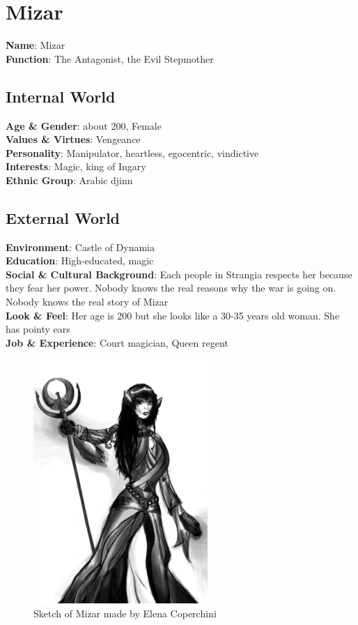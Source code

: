 \section{Mizar}

\begin{minipage}{0.5\textwidth}
\textbf{Name}: Mizar\\
\textbf{Function}: The Antagonist, the Evil Stepmother

\subsection{Internal World}

\textbf{Age \& Gender}: about 200, Female \\
\textbf{Values \& Virtues}: Vengeance \\
\textbf{Personality}: Manipulator, heartless, egocentric, vindictive \\
\textbf{Interests}: Magic, king of Ingary \\
\textbf{Ethnic Group}: Arabic djinn

\subsection{External World}
\textbf{Environment}: Castle of Dynamia \\
\textbf{Education}: High-educated, magic \\
\textbf{Social \& Cultural Background}: Each people in Strangia respects her because they fear her power. Nobody knows the real reasons why the war is going on. Nobody knows the real story of Mizar \\
\textbf{Look \& Feel}: Her age is 200 but she looks like a 30-35 years old woman. She has pointy ears  \\
\textbf{Job \& Experience}: Court magician, Queen regent \\

\end{minipage}%
%
\hfill\begin{minipage}{0.4\textwidth}
  \begin{figure}[H]
  \includegraphics{Images/Characters/mizar}
  \caption{Sketch of Mizar made by Elena Coperchini}
\end{figure}
\end{minipage}

